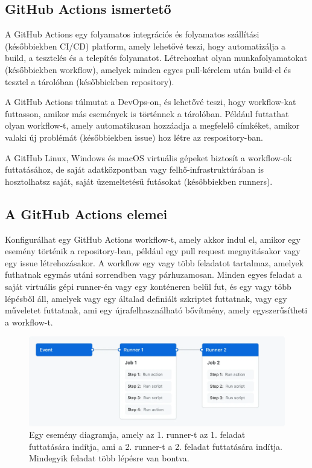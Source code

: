 \subsection{GitHub Actions ismertető}
A GitHub Actions egy folyamatos integrációs és folyamatos szállítási (későbbiekben CI/CD) platform, amely lehetővé teszi, hogy automatizálja a build, a tesztelés és a telepítés folyamatot. Létrehozhat olyan munkafolyamatokat (későbbiekben workflow), amelyek minden egyes pull-kérelem után build-el és tesztel a tárolóban (későbbiekben repository).

A GitHub Actions túlmutat a DevOps-on, és lehetővé teszi, hogy workflow-kat futtasson, amikor más események is történnek a tárolóban. Például futtathat olyan workflow-t, amely automatikusan hozzáadja a megfelelő címkéket, amikor valaki új problémát (későbbiekben issue) hoz létre az respository-ban.

A GitHub Linux, Windows és macOS virtuális gépeket biztosít a workflow-ok futtatásához, de saját adatközpontban vagy felhő-infrastruktúrában is hosztolhatsz saját, saját üzemeltetésű futásokat (későbbiekben runners).
\cite{github}

\subsection{A GitHub Actions elemei}
Konfigurálhat egy GitHub Actions workflow-t, amely akkor indul el, amikor egy esemény történik a repository-ban, például egy pull request megnyitásakor vagy egy issue létrehozásakor. A workflow egy vagy több feladatot tartalmaz, amelyek futhatnak egymás utáni sorrendben vagy párhuzamosan. Minden egyes feladat a saját virtuális gépi runner-én vagy egy konténeren belül fut, és egy vagy több lépésből áll, amelyek vagy egy általad definiált szkriptet futtatnak, vagy egy műveletet futtatnak, ami egy újrafelhasználható bővítmény, amely egyszerűsítheti a workflow-t.
\cite{github}

\begin{figure}[ht]
    \centering
         \includegraphics[width=1.0\textwidth]{figures/github/overview-actions-simple.png}
          \caption{Egy esemény diagramja, amely az 1. runner-t az 1. feladat futtatására indítja, ami a 2. runner-t a 2. feladat futtatására indítja. Mindegyik feladat több lépésre van bontva. \cite{github}}
           \label{overview-actions-simple}
\end{figure}

